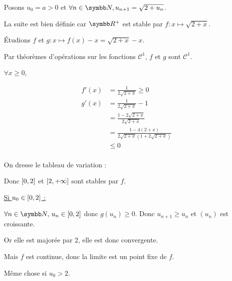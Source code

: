 \begin{exemple}
    Posons $u_0 = a > 0$ et $\forall n \in \N, u_{n + 1} = \sqrt{2 + u_n}$. 

    La suite est bien définie car $\R^+$ est stable par $f: x \mapsto \sqrt{2 + x}$. 

    Étudions $f$ et $g: x \mapsto f(x) - x = \sqrt{2 + x} - x$.

    Par théorèmes d'opérations sur les fonctions $\mathscr C^1$, $f$ et $g$ sont $\mathscr C^1$. 

    $\forall x  \geqslant 0,$

    \begin{align*}
        f'(x) & = \frac 1 {2\sqrt{2 + x}} \geqslant 0 \\
        g'(x) & = \frac 1 {2\sqrt{2 + x}} - 1 \\
        & = \frac{1 - 2 \sqrt{2 + x}}{2 \sqrt{2 + x}} \\
        & = \frac{1 - 4(2 + x)}{2 \sqrt{2 + x}\left(1 + 2\sqrt{2 + x}\right)} \\
        & \leqslant 0 \\
    \end{align*}

    On dresse le tableau de variation :
    \begin{center}
    \end{center}

    Donc $\left[0, 2\right]$ et $\left[2, +\infty\right]$ sont stables par $f$.

    \uline{Si $u_0 \in \left[0, 2\right]$ :}

    \avspace $\forall n \in \N, \, u_n \in \inter{0}{2}$ donc $g(u_n) \geqslant 0$. 
    Donc $u_{n + 1} \geqslant u_n$ et $(u_n)$ est croissante. 

    Or elle est majorée par 2, elle est donc convergente. 

    Mais $f$ est continue, donc la limite est un point fixe de $f$.

    Même chose si $u_0 > 2$. 
\end{exemple}

